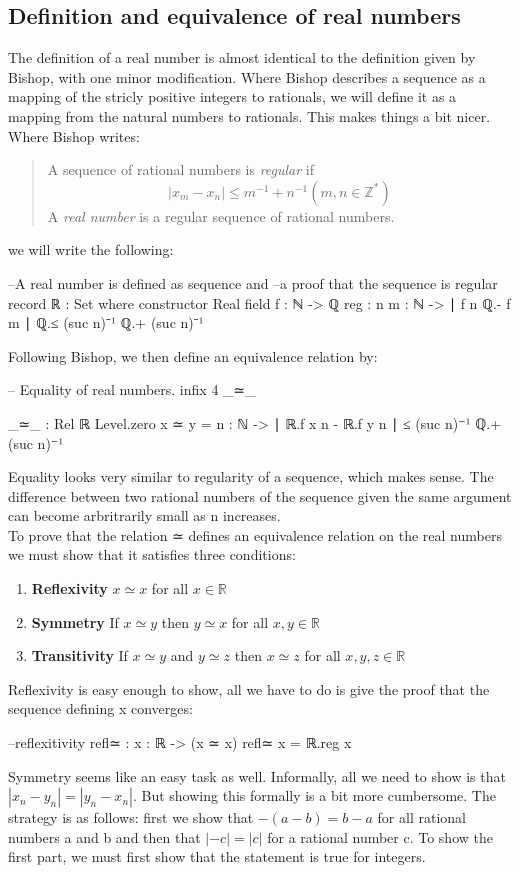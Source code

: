 \documentclass[11pt,a4paper]{article}
\begin{document}
\subsection{Definition and equivalence of real numbers}
The definition of a real number is almost identical to the definition given by Bishop, with one minor modification. Where Bishop describes a sequence as a mapping of the stricly positive integers to rationals, we will define it as a mapping from the natural numbers to rationals. This makes things a bit nicer. Where Bishop writes:
\blockquote{
A sequence of rational numbers is \textit{regular} if 
$$| x_m - x_n | \leq m^{-1} + n^{-1} (m, n \in \mathbb{Z}^*)$$
A \textit{real number} is a regular sequence of rational numbers.
}
we will write the following:
\begin{code}
--A real number is defined as sequence and 
--a proof that the sequence is regular
record ℝ : Set where
  constructor Real
  field
    f : ℕ -> ℚ
    reg : {n m : ℕ} -> ∣ f n ℚ.- f m ∣ ℚ.≤ (suc n)⁻¹ ℚ.+ (suc n)⁻¹
\end{code}
Following Bishop, we then define an equivalence relation by:
\begin{code}
-- Equality of real numbers.
infix 4 _≃_

_≃_ : Rel ℝ Level.zero
x ≃ y =  {n : ℕ} -> ∣ ℝ.f x n - ℝ.f y n ∣ ≤ (suc n)⁻¹ ℚ.+ (suc n)⁻¹
\end{code}
Equality looks very similar to regularity of a sequence, which makes sense. The difference between two rational numbers of the sequence given the same argument can become arbritrarily small as n increases.\\
To prove that the relation ≃ defines an equivalence relation on the real numbers we must show that it satisfies three conditions:
\begin{enumerate}
\item \textbf{Reflexivity} $x ≃ x$ for all $x \in \mathbb{R}$
\item \textbf{Symmetry} If $x ≃ y$ then $y ≃ x$ for all $x, y \in \mathbb{R}$
\item \textbf{Transitivity} If $x ≃ y$ and $y ≃ z$ then $x ≃ z$ for all $x, y, z \in \mathbb{R}$
\end{enumerate}
Reflexivity is easy enough to show, all we have to do is give the proof that the sequence defining x converges:
\begin{code}
--reflexitivity
refl≃ : {x : ℝ} -> (x ≃ x)
refl≃ {x} = ℝ.reg x
\end{code}
Symmetry seems like an easy task as well. Informally, all we need to show is that $| x_n - y_n | = | y_n - x_n|$. But showing this formally is a bit more cumbersome. The strategy is as follows: first we show that $- (a - b) = b - a$ for all rational numbers a and b and then that $| - c | = | c |$ for a rational number c. To show the first part, we must first show that the statement is true for integers.\\
\end{document}
